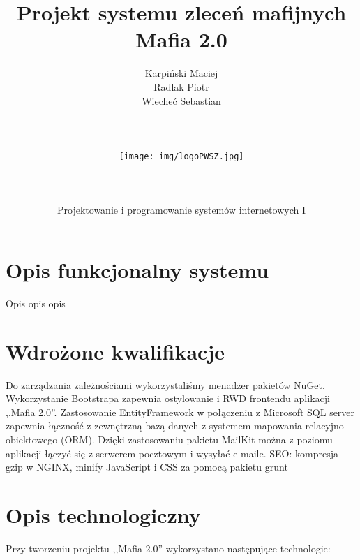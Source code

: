 \documentclass[12pt,a4paper]{article}
\author{Karpiński Maciej\\Radlak Piotr\\Wiecheć Sebastian\\\\\\\\\texttt{[image: img/logoPWSZ.jpg]}\\\\\\\\Projektowanie i programowanie systemów internetowych I}
\title{Projekt systemu zleceń mafijnych\\Mafia 2.0}
\begin{document}
	\maketitle
	\thispagestyle{empty}
	\clearpage

	\tableofcontents
	\newpage

	\section{Opis funkcjonalny systemu}
		Opis opis opis
	
	\section{Wdrożone kwalifikacje}
		
		Do zarządzania zależnościami wykorzystaliśmy menadżer pakietów NuGet.
		Wykorzystanie Bootstrapa zapewnia ostylowanie i RWD frontendu aplikacji ,,Mafia 2.0''.
		Zastosowanie EntityFramework w połączeniu z Microsoft SQL server zapewnia łączność z zewnętrzną bazą danych z systemem mapowania relacyjno-obiektowego (ORM).
		Dzięki zastosowaniu pakietu MailKit można z poziomu aplikacji łączyć się z serwerem pocztowym i wysyłać e-maile.
		SEO: kompresja gzip w NGINX, minify JavaScript i CSS za pomocą pakietu grunt 
	
	\section{Opis technologiczny}
		Przy tworzeniu projektu ,,Mafia 2.0'' wykorzystano następujące technologie:
\end{document}
